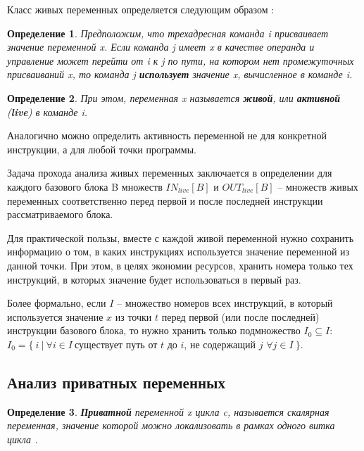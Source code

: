 \documentclass{article}
\begin{document}
Класс живых переменных определяется следующим образом \cite[643]{dragonbook}:

\newtheorem{defenition}{Определение}[subsection]

\begin{defenition}
    Предположим, что трехадресная команда i присваивает значение переменной x. Если команда j имеет x в качестве операнда и управление может
    перейти от i к j по пути, на котором нет промежуточных присваиваний x, то
    команда j \textbf{использует} значение x, вычисленное в команде i.
\end{defenition}

\begin{defenition}
    При этом, переменная x называется \textbf{живой}, или \textbf{активной} (\textbf{live}) в команде i.
\end{defenition}

Аналогично можно определить активность переменной не для конкретной инструкции, а для любой точки программы.

Задача прохода анализа живых переменных заключается в определении для каждого базового блока B множеств $IN_{live}[B]$ и $OUT_{live}[B]$ -- множеств живых переменных соответственно перед первой и после последней инструкции рассматриваемого блока.

Для практической пользы, вместе с каждой живой переменной нужно сохранить информацию о том, в каких инструкциях используется значение переменной из данной точки. При этом, в целях экономии ресурсов, 
хранить номера только тех инструкций, в которых значение будет использоваться в первый раз.

Более формально, если $I$ -- множество номеров всех инструкций, в который используется значение $x$ из точки $t$ перед первой (или после последней) инструкции базового блока, 
то нужно хранить только подмножество $I_0 \subseteq I$:\\

$I_0 = \{\ i \ |\ \forall i \in I\ $существует путь от $t$ до $i$, не содержащий $j$ $ \forall j \in I\ \}$.

\subsection{Анализ приватных переменных}

\begin{defenition}
    \textbf{Приватной} переменной x цикла c, называется скалярная переменная, значение которой можно локализовать в рамках одного витка цикла \cite{pri-var}. 
\end{defenition}
\end{document}
